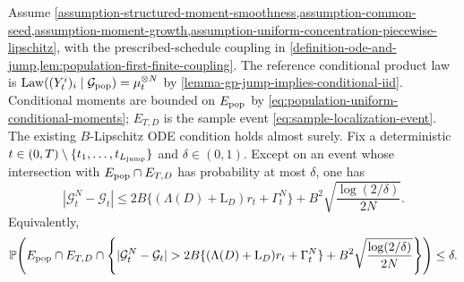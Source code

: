 \begin{lemma}
\label{lem:fixed-time-trigger-squared-gap}
Assume
\cref{assumption-structured-moment-smoothness,assumption-common-seed,assumption-moment-growth,assumption-uniform-concentration-piecewise-lipschitz},
with the prescribed-schedule coupling in
\cref{definition-ode-and-jump,lem:population-first-finite-coupling}.
The reference conditional product law is
$\operatorname{Law}((Y_t^i)_i\mid\mathcal G_{\rm pop})=\mu_t^{\otimes N}$
by \cref{lemma-gp-jump-implies-conditional-iid}.
Conditional moments are bounded on $E_{\rm pop}$ by
\eqref{eq:population-uniform-conditional-moments};
$E_{T,D}$ is the sample event \eqref{eq:sample-localization-event}.
The existing $B$-Lipschitz ODE condition holds almost surely.
Fix a deterministic
$t\in(0,T)\setminus\{t_1,\ldots,t_{L_{\mathrm{jump}}}\}$ and $\delta\in(0,1)$.
Except on an event whose intersection with $E_{\rm pop}\cap E_{T,D}$
has probability at most $\delta$, one has
\begin{equation}
 |\mathcal G_t^N-\mathcal G_t|
 \le2B\{(\Lambda(D)+\mathrm L_D)r_t+\Gamma_t^N\}
       +B^2\sqrt{\frac{\log(2/\delta)}{2N}}.
 \label{eq:fixed-time-trigger-squared-gap}
\end{equation}
Equivalently,
\[
 \mathbb P\!\left(
 E_{\rm pop}\cap E_{T,D}\cap
 \left\{|\mathcal G_t^N-\mathcal G_t|>
 2B\{(\Lambda(D)+\mathrm L_D)r_t+\Gamma_t^N\}
 +B^2\sqrt{\frac{\log(2/\delta)}{2N}}\right\}\right)\le\delta.
\]
\end{lemma}
